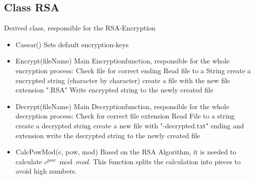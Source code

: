 \subsection{Class RSA}
Derived class, responsible for the RSA-Encryption
\begin{itemize}
	\item Caesar()
	\subitem Sets default encryption-keys
	
	\item Encrypt(fileName)
	\subitem Main Encryptionfunction, responsible for the whole encryption process:
	\subsubitem Check file for correct ending
	\subsubitem Read file to a String
	\subsubitem create a encrypted string (character by character)
	\subsubitem create a file with the new file extension ".RSA" 
	\subsubitem Write encrypted string to the newly created file
	
	\item Decrypt(fileName)
	\subitem Main Decryptionfunction, responsible for the whole decryption process:
	\subsubitem Check for correct file extension
	\subsubitem Read File to a string
	\subsubitem create a decrypted string
	\subsubitem create a new file with "-decrypted.txt" ending and extension
	\subsubitem write the decrypted string to the newly created file
	
	\item CalcPowMod(c, pow, mod)
	\subitem Based on the RSA Algorithm, it is needed to calculate \(c^{pow} \bmod mod\). This function splits the calculation into pieces to avoid high numbers.
\end{itemize}

